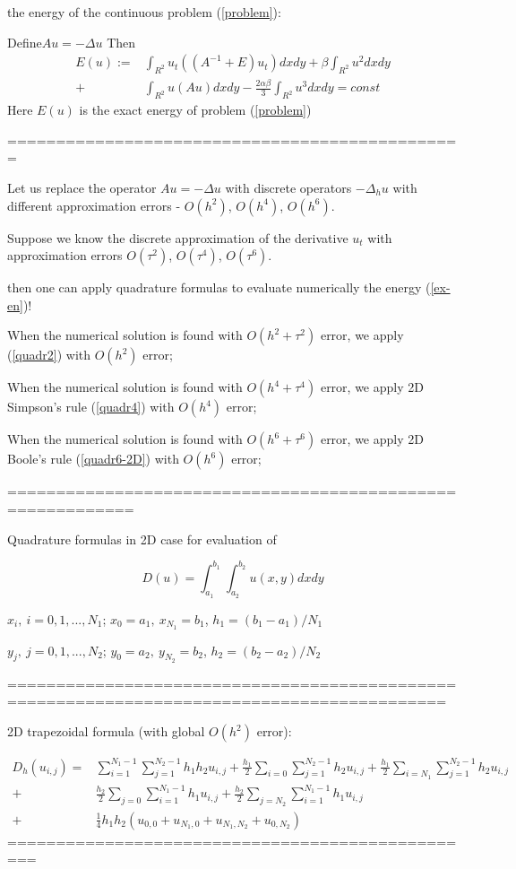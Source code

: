 \documentclass{article}
\newcommand{\rf}[1]{(\ref{#1})}
\begin{document}
\newpage

the energy of the continuous problem \rf{problem}:

Define$Au=-\Delta u$
Then
\begin{align}\label{ex-en}
E(u):=&\int_{R^2} u_t \left((A^{-1}+E)u_t\right) dxdy+
\beta \int_{R^2} u^2 dxdy \nonumber\\
+& \int_{R^2}u \left(A u\right) dxdy
-\frac{2 \alpha \beta}{3} \int_{R^2} u^3 dxdy =const
\end{align}
Here $E(u)$ is the exact energy of problem \rf{problem}

===============================================


Let us replace the operator $Au=-
\Delta u$ with discrete operators $-\Delta_h u$ with different approximation errors - $O(h^2)$, $O(h^4)$, $O(h^6)$.

Suppose we know the discrete approximation of the derivative $u_t$
with approximation errors $O(\tau^2)$, $O(\tau^4)$, $O(\tau^6)$.

then one can apply quadrature formulas to evaluate numerically
the energy \rf{ex-en}!

When the numerical solution is found with $O(h^2+\tau^2)$ error,
we apply \rf{quadr2} with $O(h^2)$ error;


When the numerical solution is found with $O(h^4+\tau^4)$ error,
we apply 2D Simpson's rule \rf{quadr4} with $O(h^4)$ error;

When the numerical solution is found with $O(h^6+\tau^6)$ error,
we apply 2D Boole's rule \rf{quadr6-2D} with $O(h^6)$ error;

===========================================================

Quadrature formulas in 2D case for evaluation of 

\begin{equation}\label{int}
D(u)=\int_{a_1}^{b_1} \int_{a_2}^{b_2} u(x,y)dx dy
\end{equation}

$x_i, ~i=0,1,...,N_1$; $x_0=a_1,~x_{N_1}=b_1$, $h_1=(b_1-a_1)/N_1$


$y_j, ~j=0,1,...,N_2$; $y_0=a_2,~y_{N_2}=b_2$,  $h_2=(b_2-a_2)/N_2$

===========================================================================================

2D trapezoidal formula (with global $O(h^2)$ error):

\begin{align}\label{quadr2}
D_h(u_{i,j}) =& \sum_{i=1}^{N_1-1} \sum_{j=1}^{N_2-1} h_1 h_2 u_{i,j}
+\frac{h_1}{2}\sum_{i=0} \sum_{j=1}^{N_2-1} h_2 u_{i,j}
+\frac{h_1}{2}\sum_{i=N_1} \sum_{j=1}^{N_2-1} h_2 u_{i,j} \nonumber\\
+&\frac{h_2}{2}\sum_{j=0} \sum_{i=1}^{N_1-1} h_1 u_{i,j}
+\frac{h_2}{2}\sum_{j=N_2} \sum_{i=1}^{N_1-1} h_1 u_{i,j}
\nonumber\\
+&\frac{1}{4}h_1 h_2 \left(u_{0,0}+u_{N_1,0}+u_{N_1,N_2}+u_{0,N_2}
\right)
\end{align}
=================================================
\end{document}

